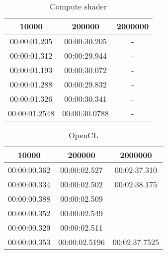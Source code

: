 \begin{table}[h]
\caption{Compute shader}
\begin{tabular}{|c|c|c|}
\hline
10000 & 200000 & 2000000 \\
\hline
00:00:01.205 & 00:00:30.205 & - \\
00:00:01.312  & 00:00:29.944 & - \\
00:00:01.193  & 00:00:30.072 & - \\
00:00:01.288  & 00:00:29.832 & - \\
00:00:01.326  & 00:00:30.341 & - \\
00:00:01.2548  & 00:00:30.0788 & - \\
\hline
\end{tabular}
\end{table}

\begin{table}[h]
\caption{OpenCL}
\begin{tabular}{|c|c|c|}
\hline
10000 & 200000 & 2000000 \\
\hline
00:00:00.362 & 00:00:02.527 & 00:02:37.310  \\
00:00:00.334  & 00:00:02.502 & 00:02:38.175 \\
00:00:00.388  & 00:00:02.509 & \\
00:00:00.352 & 00:00:02.549 & \\
00:00:00.329  & 00:00:02.511 & \\
00:00:00.353  & 00:00:02.5196 & 00:02:37.7525\\
\hline
\end{tabular}
\end{table}
